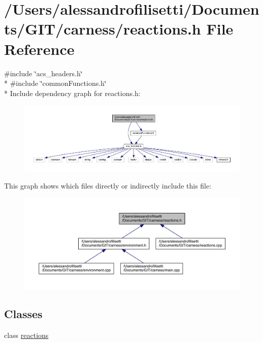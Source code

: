 \hypertarget{a00093}{\section{/\-Users/alessandrofilisetti/\-Documents/\-G\-I\-T/carness/reactions.h File Reference}
\label{a00093}
}
{\ttfamily \#include \char`\"{}acs\-\_\-headers.\-h\char`\"{}}\\*
{\ttfamily \#include \char`\"{}common\-Functions.\-h\char`\"{}}\\*
Include dependency graph for reactions.\-h\-:\nopagebreak
\begin{figure}[H]
\begin{center}
\leavevmode
\includegraphics[width=350pt]{a00142}
\end{center}
\end{figure}
This graph shows which files directly or indirectly include this file\-:\nopagebreak
\begin{figure}[H]
\begin{center}
\leavevmode
\includegraphics[width=350pt]{a00143}
\end{center}
\end{figure}
\subsection*{Classes}
\begin{DoxyCompactItemize}
\item 
class \hyperlink{a00021}{reactions}
\end{DoxyCompactItemize}
